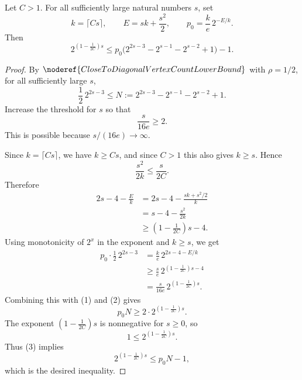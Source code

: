 \begin{helper}
Let \(C>1\).  For all sufficiently large natural numbers \(s\), set
\[
  k=\lceil Cs\rceil,\qquad
  E=sk+\frac{s^2}{2},\qquad
  p_0=\frac{k}{e}\,2^{-E/k}.
\]
Then
\[
  2^{(1-\frac{1}{2C})s}
  \le
  p_0\bigl(2^{2s-3}-2^{s-1}-2^{s-2}+1\bigr)-1.
\]
\end{helper}
\begin{proof}
By \(\noderef{CloseToDiagonalVertexCountLowerBound}\) with
\(\rho=1/2\), for all sufficiently large \(s\),
\[
  \frac12\,2^{2s-3}
  \le
  N:=2^{2s-3}-2^{s-1}-2^{s-2}+1. \tag{1}
\]
Increase the threshold for \(s\) so that
\[
  \frac{s}{16e}\ge2. \tag{2}
\]
This is possible because \(s/(16e)\to\infty\).

Since \(k=\lceil Cs\rceil\), we have \(k\ge Cs\), and since \(C>1\) this also
gives \(k\ge s\).  Hence
\[
  \frac{s^2}{2k}\le\frac{s}{2C}.
\]
Therefore
\[
\begin{aligned}
  2s-4-\frac{E}{k}
  &=2s-4-\frac{sk+s^2/2}{k}  \\
  &=s-4-\frac{s^2}{2k} \\
  &\ge \left(1-\frac{1}{2C}\right)s-4.
\end{aligned}
\]
Using monotonicity of \(2^x\) in the exponent and \(k\ge s\), we get
\[
\begin{aligned}
  p_0\cdot\frac12\,2^{2s-3}
  &=
  \frac{k}{e}\,2^{2s-4-E/k} \\
  &\ge
  \frac{s}{e}\,2^{(1-\frac{1}{2C})s-4} \\
  &=
  \frac{s}{16e}\,2^{(1-\frac{1}{2C})s}.
\end{aligned}
\]
Combining this with (1) and (2) gives
\[
  p_0N\ge2\cdot2^{(1-\frac{1}{2C})s}. \tag{3}
\]
The exponent \((1-\frac{1}{2C})s\) is nonnegative for \(s\ge0\), so
\[
  1\le2^{(1-\frac{1}{2C})s}.
\]
Thus (3) implies
\[
  2^{(1-\frac{1}{2C})s}
  \le p_0N-1,
\]
which is the desired inequality.
\end{proof}
